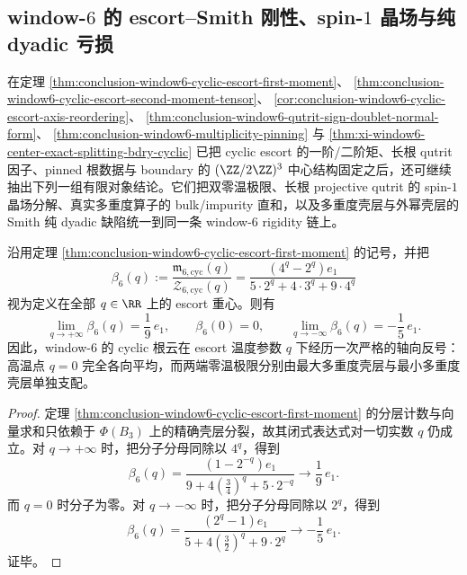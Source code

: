 \subsection{window-\texorpdfstring{$6$}{6} 的 escort--Smith 刚性、spin-\texorpdfstring{$1$}{1} 晶场与纯 dyadic 亏损}\label{subsec:conclusion-window6-escort-smith-zeeman-dyadic-rigidity}

在定理 \ref{thm:conclusion-window6-cyclic-escort-first-moment}、
\ref{thm:conclusion-window6-cyclic-escort-second-moment-tensor}、
\ref{cor:conclusion-window6-cyclic-escort-axis-reordering}、
\ref{thm:conclusion-window6-qutrit-sign-doublet-normal-form}、
\ref{thm:conclusion-window6-multiplicity-pinning} 与
\ref{thm:xi-window6-center-exact-splitting-bdry-cyclic} 已把 cyclic escort 的一阶/二阶矩、长根 qutrit 因子、pinned 根数据与 boundary 的 \((\ZZ/2\ZZ)^3\) 中心结构固定之后，还可继续抽出下列一组有限对象结论。它们把双零温极限、长根 projective qutrit 的 spin-\(1\) 晶场分解、真实多重度算子的 bulk/impurity 直和，以及多重度壳层与外幂壳层的 Smith 纯 dyadic 缺陷统一到同一条 window-\(6\) rigidity 链上。

\begin{corollary}\label{cor:conclusion-window6-cyclic-escort-dual-zero-temp}
沿用定理 \ref{thm:conclusion-window6-cyclic-escort-first-moment} 的记号，并把
\[
\beta_6(q):=
\frac{\mathfrak m_{6,\mathrm{cyc}}(q)}{\mathcal Z_{6,\mathrm{cyc}}(q)}
=
\frac{(4^q-2^q)e_1}{5\cdot 2^q+4\cdot 3^q+9\cdot 4^q}
\]
视为定义在全部 \(q\in\RR\) 上的 escort 重心。则有
\[
\lim_{q\to+\infty}\beta_6(q)=\frac19\,e_1,
\qquad
\beta_6(0)=0,
\qquad
\lim_{q\to-\infty}\beta_6(q)=-\frac15\,e_1.
\]
因此，window-\(6\) 的 cyclic 根云在 escort 温度参数 \(q\) 下经历一次严格的轴向反号：高温点 \(q=0\) 完全各向平均，而两端零温极限分别由最大多重度壳层与最小多重度壳层单独支配。
\end{corollary}
\begin{proof}
定理 \ref{thm:conclusion-window6-cyclic-escort-first-moment} 的分层计数与向量求和只依赖于 \(\Phi(B_3)\) 上的精确壳层分裂，故其闭式表达式对一切实数 \(q\) 仍成立。对 \(q\to+\infty\) 时，把分子分母同除以 \(4^q\)，得到
\[
\beta_6(q)=
\frac{(1-2^{-q})e_1}{9+4\left(\frac34\right)^q+5\cdot 2^{-q}}
\longrightarrow \frac19\,e_1.
\]
而 \(q=0\) 时分子为零。对 \(q\to-\infty\) 时，把分子分母同除以 \(2^q\)，得到
\[
\beta_6(q)=
\frac{(2^q-1)e_1}{5+4\left(\frac32\right)^q+9\cdot 2^q}
\longrightarrow -\frac15\,e_1.
\]
证毕。
\end{proof}

